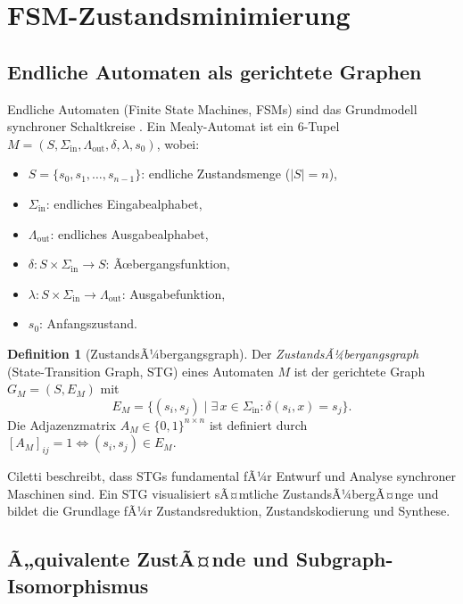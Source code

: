 ﻿\documentclass[a4paper,12pt]{article}
\theoremstyle{definition}
\newtheorem{definition}{Definition}
\begin{document}
\section{FSM-Zustandsminimierung}

\subsection{Endliche Automaten als gerichtete Graphen}

Endliche Automaten (Finite State Machines, FSMs) sind das Grundmodell synchroner
Schaltkreise \cite[Kap.~3]{ciletti2011}. Ein Mealy-Automat ist ein 6-Tupel
$M = (S, \Sigma_{\text{in}}, \Lambda_{\text{out}}, \delta, \lambda, s_0)$, wobei:

\begin{itemize}
  \item $S = \{s_0, s_1, \ldots, s_{n-1}\}$: endliche Zustandsmenge ($|S| = n$),
  \item $\Sigma_{\text{in}}$: endliches Eingabealphabet,
  \item $\Lambda_{\text{out}}$: endliches Ausgabealphabet,
  \item $\delta: S \times \Sigma_{\text{in}} \to S$: Ãœbergangsfunktion,
  \item $\lambda: S \times \Sigma_{\text{in}} \to \Lambda_{\text{out}}$: Ausgabefunktion,
  \item $s_0$: Anfangszustand.
\end{itemize}

\begin{definition}[ZustandsÃ¼bergangsgraph]
  Der \emph{ZustandsÃ¼bergangsgraph} (State-Transition Graph, STG) eines Automaten $M$ ist
  der gerichtete Graph $G_M = (S, E_M)$ mit
  \[
    E_M = \bigl\{(s_i, s_j) \;\big|\; \exists\, x \in \Sigma_{\text{in}}: \delta(s_i, x) = s_j\bigr\}.
  \]
  Die Adjazenzmatrix $A_M \in \{0,1\}^{n \times n}$ ist definiert durch
  $[A_M]_{ij} = 1 \Leftrightarrow (s_i, s_j) \in E_M$.
\end{definition}

Ciletti \cite[S.~82]{ciletti2011} beschreibt, dass STGs fundamental fÃ¼r Entwurf und
Analyse synchroner Maschinen sind. Ein STG visualisiert sÃ¤mtliche ZustandsÃ¼bergÃ¤nge
und bildet die Grundlage fÃ¼r Zustandsreduktion, Zustandskodierung und Synthese.

\subsection{Ã„quivalente ZustÃ¤nde und Subgraph-Isomorphismus}
\end{document}
